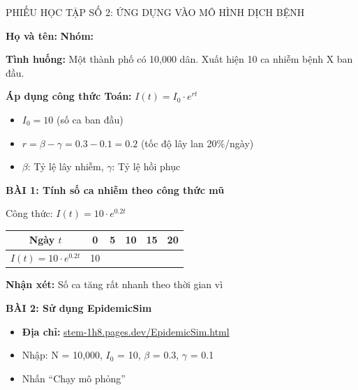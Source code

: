 \documentclass[12pt,a4paper]{article}
\newcommand{\header}[1]{\cellcolor{TableHeader}\sffamily\bfseries#1}
\begin{document}
\newpage
\begin{phieuhoctap}{PHIẾU HỌC TẬP SỐ 2: ỨNG DỤNG VÀO MÔ HÌNH DỊCH BỆNH}

\noindent\textbf{Họ và tên:} \underline{\hspace{6cm}} \hfill \textbf{Nhóm:} \underline{\hspace{2cm}}

\vspace{0.5cm}
\begin{appbox}
\textbf{Tình huống:} Một thành phố có 10,000 dân. Xuất hiện 10 ca nhiễm bệnh X ban đầu.

\textbf{Áp dụng công thức Toán:} $I(t) = I_0 \cdot e^{rt}$
\begin{itemize}
\item $I_0 = 10$ (số ca ban đầu)
\item $r = \beta - \gamma = 0.3 - 0.1 = 0.2$ (tốc độ lây lan 20\%/ngày)
\item $\beta$: Tỷ lệ lây nhiễm, $\gamma$: Tỷ lệ hồi phục
\end{itemize}
\end{appbox}

\vspace{0.5cm}
\textbf{\color{accent}BÀI 1: Tính số ca nhiễm theo công thức mũ}

Công thức: $I(t) = 10 \cdot e^{0.2t}$

\begin{tabularx}{\textwidth}{|C|C|C|C|C|C|}
\hline
\header{Ngày $t$} & 0 & 5 & 10 & 15 & 20 \\
\hline
$I(t) = 10 \cdot e^{0.2t}$ & 10 & \underline{\hspace{1.5cm}} & \underline{\hspace{1.5cm}} & \underline{\hspace{1.5cm}} & \underline{\hspace{1.5cm}} \\
\hline
\end{tabularx}

\textbf{Nhận xét:} Số ca tăng rất nhanh theo thời gian vì \underline{\hspace{5cm}}

\vspace{0.5cm}
\textbf{\color{accent}BÀI 2: Sử dụng EpidemicSim}
\begin{itemize}
\item \textbf{Địa chỉ:} \href{https://stem-1h8.pages.dev/EpidemicSim.html}{stem-1h8.pages.dev/EpidemicSim.html}
\item Nhập: N = 10,000, $I_0$ = 10, $\beta$ = 0.3, $\gamma$ = 0.1
\item Nhấn ``Chạy mô phỏng''
\end{itemize}


\end{phieuhoctap}
\end{document}
